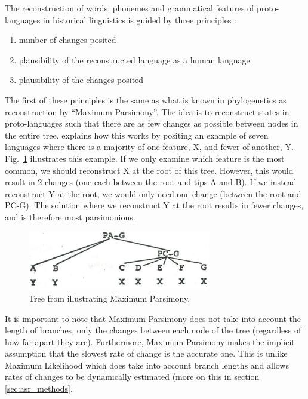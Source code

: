 \documentclass[draft,10pt]{article} %
\begin{document}
The reconstruction of words, phonemes and grammatical features of proto-languages in historical linguistics is guided by three principles \citep[17-22]{clark1976aspects}:

\begin{enumerate}[label=(\roman*)]
\item number of changes posited
\item plausibility of the reconstructed language as a human language
\item plausibility of the changes posited
\end{enumerate}

The first of these principles is the same as what is known in phylogenetics as reconstruction by ``Maximum Parsimony''. The idea is to reconstruct states in proto-languages such that there are as few changes as possible between nodes in the entire tree. \citet[17-22]{clark1976aspects} explains how this works by positing an example of seven languages where there is a majority of one feature, X, and fewer of another, Y. Fig.~\ref{fig:clark_tree} illustrates this example. If we only examine which feature is the most common, we should reconstruct X at the root of this tree. However, this would result in 2 changes (one each between the root and tips A and B). If we instead reconstruct Y at the root, we would only need one change (between the root and PC-G). The solution where we reconstruct Y at the root results in fewer changes, and is therefore most parsimonious.
 
\begin{figure}[h]
\centering
\includegraphics[width=8cm]{illustrations/Clark_1977_tree.png}
\caption{{Tree from \citet[19]{clark1976aspects} illustrating Maximum Parsimony.}}
\label{fig:clark_tree}
\end{figure}

It is important to note that Maximum Parsimony does not take into account the length of branches, only the changes between each node of the tree (regardless of how far apart they are). Furthermore, Maximum Parsimony makes the implicit assumption that the slowest rate of change is the accurate one. This is unlike Maximum Likelihood which does take into account branch lengths and allows rates of changes to be dynamically estimated (more on this in section \ref{sec:asr_methods}.
\end{document}
